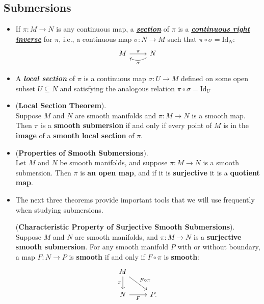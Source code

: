 \documentclass[11pt]{article}
\begin{document}
\subsection{Submersions}
\begin{itemize}
\item \begin{definition}
If $\pi: M \rightarrow N$ is any continuous map, a \underline{\emph{\textbf{section}}} of $\pi$ is a \underline{\emph{\textbf{continuous right inverse}}} for $\pi$, i.e., a continuous map $\sigma: N \rightarrow M$ such that $\pi \circ \sigma = \text{Id}_N$:
\[
  \begin{tikzcd}
     M  \arrow{r}{\pi}  & N   \arrow[l, bend left,  "\sigma"] 
  \end{tikzcd}
\] 
\end{definition}

\item \begin{definition}
A \emph{\textbf{local section}} of $\pi$ is a continuous map $\sigma: U \rightarrow M$ defined on some open subset $U \subseteq N$ and satisfying the analogous relation $\pi \circ \sigma = \text{Id}_U$
\end{definition}

\item \begin{theorem} (\textbf{Local Section Theorem}). \citep{lee2003introduction}\\
Suppose $M$ and $N$ are smooth manifolds and $\pi: M \rightarrow N$ is a smooth map. Then $\pi$ is a \textbf{smooth submersion} if and only if every point of $M$ is in the \textbf{image} of a \textbf{smooth local section} of $\pi$.
\end{theorem}

\item \begin{proposition} (\textbf{Properties of Smooth Submersions}). \\
Let $M$ and $N$ be smooth manifolds, and suppose $\pi: M \rightarrow N$ is a smooth submersion. Then $\pi$ is \textbf{an open map}, and if it is \textbf{surjective} it is a \textbf{quotient map}.
\end{proposition}

\item The next three theorems provide important tools that we will use frequently
when studying submersions. 
\begin{theorem} (\textbf{Characteristic Property of Surjective Smooth Submersions}).\\
Suppose $M$ and $N$ are smooth manifolds, and $\pi: M \rightarrow N$ is a \textbf{surjective smooth submersion}. For any smooth manifold $P$ with or without boundary, a map $F: N \rightarrow P$ is \textbf{smooth} if and only if $F \circ \pi$ is \textbf{smooth}:
\[
  \begin{tikzcd}
     M  \arrow[swap]{d}{\pi} \arrow[dr, "F \circ \pi"]  & \\
     N   \arrow[r, swap,  "F"]  & P.
  \end{tikzcd}
\] 
\end{theorem}



\end{itemize}
\end{document}
